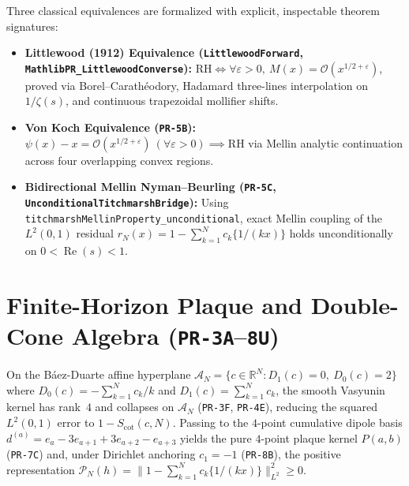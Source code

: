 \documentclass[11pt,a4paper]{article}
\theoremstyle{definition}
\newcommand{\Rset}{\mathbb{R}}
\begin{document}
Three classical equivalences are formalized with explicit, inspectable theorem signatures:
\begin{itemize}[leftmargin=1.6em]
  \item \textbf{Littlewood (1912) Equivalence (\texttt{LittlewoodForward}, \texttt{MathlibPR\_LittlewoodConverse}):} $\mathrm{RH} \iff \forall \varepsilon > 0,\ M(x) = \mathcal{O}(x^{1/2 + \varepsilon})$, proved via Borel--Carath\'eodory, Hadamard three-lines interpolation on $1/\zeta(s)$, and continuous trapezoidal mollifier shifts.
  \item \textbf{Von Koch Equivalence (\texttt{PR-5B}):} $\psi(x) - x = \mathcal{O}(x^{1/2 + \varepsilon})\ (\forall \varepsilon > 0) \implies \mathrm{RH}$ via Mellin analytic continuation across four overlapping convex regions.
  \item \textbf{Bidirectional Mellin Nyman--Beurling (\texttt{PR-5C}, \texttt{UnconditionalTitchmarshBridge}):} Using \texttt{titchmarshMellinProperty\_\allowbreak unconditional}, exact Mellin coupling of the $L^2(0,1)$ residual $r_N(x) = 1 - \sum_{k=1}^N c_k \{1/(kx)\}$ holds unconditionally on $0 < \operatorname{Re}(s) < 1$.
\end{itemize}

\section{Finite-Horizon Plaque and Double-Cone Algebra (\texttt{PR-3A}--\texttt{8U})}

On the B\'aez-Duarte affine hyperplane $\mathcal{A}_N = \{c \in \Rset^N : D_1(c) = 0,\ D_0(c) = 2\}$ where $D_0(c) = -\sum_{k=1}^N c_k/k$ and $D_1(c) = \sum_{k=1}^N c_k$, the smooth Vasyunin kernel has rank~$4$ and collapses on $\mathcal{A}_N$ (\texttt{PR-3F}, \texttt{PR-4E}), reducing the squared $L^2(0,1)$ error to $1 - S_{\mathrm{cot}}(c, N)$. Passing to the $4$-point cumulative dipole basis $d^{(a)} = e_a - 3e_{a+1} + 3e_{a+2} - e_{a+3}$ yields the pure $4$-point plaque kernel $P(a,b)$ (\texttt{PR-7C}) and, under Dirichlet anchoring $c_1 = -1$ (\texttt{PR-8B}), the positive representation $\mathcal{P}_N(h) = \|1 - \sum_{k=1}^N c_k \{1/(kx)\}\|_{L^2}^2 \ge 0$.
\end{document}
